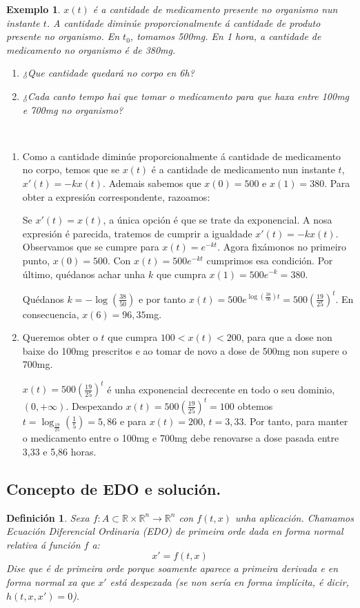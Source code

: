 \documentclass[11pt, a4paper,twoside]{article}
\makeatletter
\newcommand{\iindex}[1]{\emph{#1}\index{#1}}
\theoremstyle{theorem-style}  %
\renewenvironment{proof}[1][\proofname]{\par
	\pushQED{\qed}%
	\normalfont \topsep6\p@\@plus6\p@\relax
	\list{}{%
		\settowidth{\leftmargin}{\quad:\hskip\labelsep}%
		\setlength{\labelwidth}{0pt}%
		\setlength{\itemindent}{-\leftmargin}%
	}%
	\item[\hskip\labelsep\itshape#1\@addpunct{:}]\ignorespaces
}{%
	\popQED\endlist\@endpefalse
}
\theoremstyle{definition-style}
\newtheorem{definition}{Definición}[section]
\theoremstyle{example-style}
\newtheorem{example}{Exemplo}[section]
\makeatother
\begin{document}
\begin{example}
	$ x(t) $ é a cantidade de medicamento presente no organismo nun instante $ t $. A cantidade diminúe proporcionalmente á cantidade de produto presente no organismo. En $ t_0 $, tomamos 500mg. En 1 hora, a cantidade de medicamento no organismo é de 380mg.
	\begin{enumerate}[\qquad a)]
		\item ¿Que cantidade quedará no corpo en 6h?
		\item ¿Cada canto tempo hai que tomar o medicamento para que haxa entre 100mg e 700mg no organismo? 
	\end{enumerate}
\end{example}
\begin{proof}[Solución] \ 
	\begin{enumerate}[\qquad a)]
		\item Como a cantidade diminúe proporcionalmente á cantidade de medicamento no corpo, temos que se $ x(t) $ é a cantidade de medicamento nun instante $ t $, $ x'(t)=-kx(t) $. Ademais sabemos que $ x(0)=500 $ e $ x(1)=380 $. Para obter a expresión correspondente, razoamos:

		Se $ x'(t)=x(t) $, a única opción é que se trate da exponencial. A nosa expresión é parecida, tratemos de cumprir a igualdade $ x'(t)=-kx(t) $. Observamos que se cumpre para $ x(t)=e^{-kt} $. Agora fixámonos no primeiro punto,  $ x(0)=500 $. Con  $ x(t)=500e^{-kt} $ cumprimos esa condición. Por último, quédanos achar unha $ k $ que cumpra $ x(1)=500e^{-k}=380 $. 
		
		Quédanos $ k=-\log(\frac{38}{50}) $ e por tanto $ x(t)=500e^{\log(\frac{38}{50})t} =500(\frac{19}{25})^t$. En consecuencia, $ x(6)=96,35 $mg.

		\item Queremos obter o $ t $ que cumpra $ 100<x(t)<200 $, para que a dose non baixe do 100mg prescritos e ao tomar de novo a dose de 500mg non supere o 700mg.

		$ x(t)=500(\frac{19}{25})^t$ é unha exponencial decrecente en todo o seu dominio, $ (0, +\infty) $. Despexando $ x(t)=500(\frac{19}{25})^t=100$ obtemos $ t=\log_{\frac{19}{25}}(\frac{1}{5})=5,86 $ e para $ x(t)=200 $, $ t=3,33 $. Por tanto, para manter o medicamento entre o 100mg e 700mg debe renovarse a dose pasada entre 3,33 e 5,86 horas.
	\end{enumerate}
\end{proof}

\subsection{Concepto de EDO e solución.}
\begin{definition}
	Sexa $f: A \subset \mathbb{R} \times \mathbb{R}^n \longrightarrow \mathbb{R}^n$ con $f(t, x)$ unha aplicación. Chamamos \iindex{Ecuación Diferencial Ordinaria} (EDO) de primeira orde dada en forma normal relativa á función $f$ a: 
	\[ x' = f(t, x) \]
	Dise que é de primeira orde porque soamente aparece a primeira derivada e en forma normal xa que $x'$ está despexada (se non sería en forma implícita, é dicir, $h(t, x, x')=0$).
\end{definition}
\end{document}
